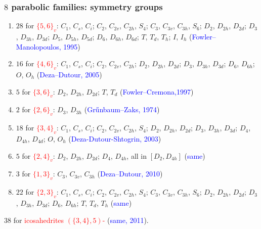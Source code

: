 \documentclass{beamer}
\begin{document}
\begin{frame}\frametitle{$8$ parabolic families: symmetry  groups}
\vspace{-2mm}

\begin{enumerate}
\item
$28$ for \textcolor{red}{$\{5,6\}_v$}:  
$C_1$, $C_s$, $C_i$; $C_2$, $C_{2v}$, $C_{2h}$, $S_4$; $C_3$,
$C_{3v}$, $C_{3h}$, $S_6$; $D_2$, $D_{2h}$, $D_{2d}$; $D_3$,  
$D_{3h}$, $D_{3d}$; $D_5$, $D_{5h}$, $D_{5d}$; $D_6$, $D_{6h}$,
$D_{6d}$; $T$, $T_d$, $T_h$; $I$, $I_h$ 
(\textcolor{blue}{Fowler--Manolopoulos, 1995})
\item
$16$ for \textcolor{red}{$\{4,6\}_v$}: $C_1$, $C_s$,
$C_{i}$; $C_2$, $C_{2v}$, $C_{2h}$; $D_2$, $D_{2h}$, $D_{2d}$; $D_3$,
$D_{3h}$, $D_{3d}$; $D_6$, $D_{6h}$; $O$, $O_h$
(\textcolor{blue}{Deza--Dutour,  2005})
\item
$5$ for \textcolor{red}{$\{3,6\}_v$}: $D_{2}$,
$D_{2h}$, $D_{2d}$; $T$, $T_d$ (\textcolor{blue}{Fowler--Cremona,1997})
\item
$2$ for \textcolor{red}{$\{2, 6\}_v$}: $D_3$, $D_{3h}$ 
(\textcolor{blue}{Gr\H{u}nbaum--Zaks, 1974})
\item
$18$ for \textcolor{red}{$\{3, 4\}_v$}: $C_{1}$, $C_s$,
$C_i$; $C_2$, $C_{2v}$, $C_{2h}$, $S_4$; $D_2$, $D_{2h}$, $D_{2d}$;
$D_3$, $D_{3h}$, $D_{3d}$; $D_4$,
$D_{4h}$, $D_{4d}$; $O$, $O_h$   
(\textcolor{blue}{Deza-Dutour-Shtogrin, 2003})
\item
$5$ for \textcolor{red}{$\{2, 4\}_v$}: $D_2$, $D_{2h}$, 
$D_{2d}$; $D_4$, $D_{4h}$, all in $[D_2,D_{4h}]$ (\textcolor{blue}{same})
\item
$3$ for \textcolor{red}{$\{1, 3\}_v$}:  $C_3$,
$C_{3v}$,  $C_{3h}$ (\textcolor{blue}{Deza--Dutour,  2010})
\item
$22$ for \textcolor{red}{$\{2, 3\}_v$}: $C_1$, 
$C_s$, $C_i$; $C_2$, $C_{2v}$, $C_{2h}$,  $S_4$; $C_3$,
$C_{3v}$, $C_{3h}$, $S_6$; $D_2$, $D_{2h}$, $D_{2d}$; $D_3$,
$D_{3h}$, $D_{3d}$; $D_6$, $D_{6h}$; $T$, $T_d$, $T_h$ 
(\textcolor{blue}{same}) 
\end{enumerate}
$38$ for  \textcolor{red}{icosahedrites $(\{3,4\},5)$-} 
(\textcolor{blue}{same, 2011}).
\end{frame}
\end{document}

